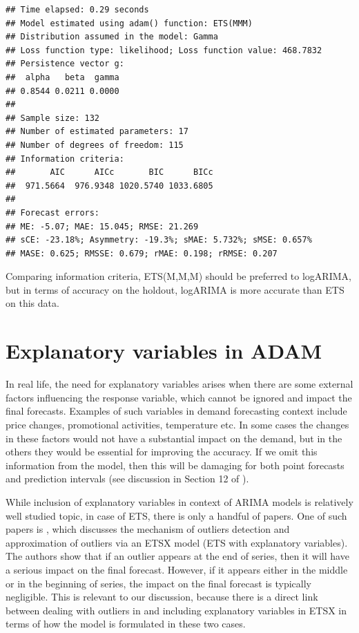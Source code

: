 \documentclass[
]{book}
\theoremstyle{definition}
\theoremstyle{definition}
\theoremstyle{definition}
\theoremstyle{definition}
\theoremstyle{remark}
\begin{document}
\begin{verbatim}
## Time elapsed: 0.29 seconds
## Model estimated using adam() function: ETS(MMM)
## Distribution assumed in the model: Gamma
## Loss function type: likelihood; Loss function value: 468.7832
## Persistence vector g:
##  alpha   beta  gamma 
## 0.8544 0.0211 0.0000 
## 
## Sample size: 132
## Number of estimated parameters: 17
## Number of degrees of freedom: 115
## Information criteria:
##       AIC      AICc       BIC      BICc 
##  971.5664  976.9348 1020.5740 1033.6805 
## 
## Forecast errors:
## ME: -5.07; MAE: 15.045; RMSE: 21.269
## sCE: -23.18%; Asymmetry: -19.3%; sMAE: 5.732%; sMSE: 0.657%
## MASE: 0.625; RMSSE: 0.679; rMAE: 0.198; rRMSE: 0.207
\end{verbatim}

Comparing information criteria, ETS(M,M,M) should be preferred to logARIMA, but in terms of accuracy on the holdout, logARIMA is more accurate than ETS on this data.

\hypertarget{ADAMX}{%
\chapter{Explanatory variables in ADAM}\label{ADAMX}}

In real life, the need for explanatory variables arises when there are some external factors influencing the response variable, which cannot be ignored and impact the final forecasts. Examples of such variables in demand forecasting context include price changes, promotional activities, temperature etc. In some cases the changes in these factors would not have a substantial impact on the demand, but in the others they would be essential for improving the accuracy. If we omit this information from the model, then this will be damaging for both point forecasts and prediction intervals (see discussion in Section 12 of \citet{SvetunkovSBA}).

While inclusion of explanatory variables in context of ARIMA models is relatively well studied topic, in case of ETS, there is only a handful of papers. One of such papers is \citet{Koehler2012}, which discusses the mechanism of outliers detection and approximation of outliers via an ETSX model (ETS with explanatory variables). The authors show that if an outlier appears at the end of series, then it will have a serious impact on the final forecast. However, if it appears either in the middle or in the beginning of series, the impact on the final forecast is typically negligible. This is relevant to our discussion, because there is a direct link between dealing with outliers in \citet{Koehler2012} and including explanatory variables in ETSX in terms of how the model is formulated in these two cases.
\end{document}
